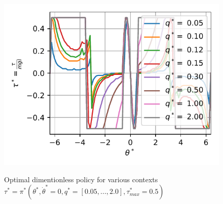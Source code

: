 \begin{figure}[ht]
\begin{center}
\includegraphics[width=0.99\linewidth]{fig/s_q_5_2.pdf}
\caption{Optimal dimentionless policy for various contexts  $\tau^* = \pi^*( \theta^*  , \dot{\theta}^* = 0 , q^* = [0.05, ... , 2.0]  , \tau^*_{max} = 0.5 )$}
\vspace{-10pt}
\label{fig:q_sensitivity}
\end{center}
\end{figure}

